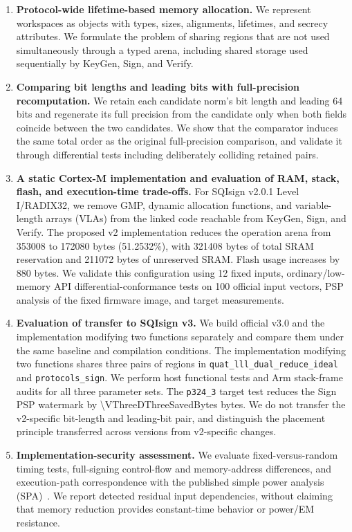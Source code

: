 \documentclass[a4paper,10pt]{article}
\theoremstyle{definition}
\theoremstyle{remark}
\begin{document}
\begin{enumerate}[leftmargin=2.2em]
  \item \textbf{Protocol-wide lifetime-based memory allocation.}
        We represent workspaces as objects with types, sizes, alignments, lifetimes, and secrecy attributes. We formulate the problem of sharing regions that are not used simultaneously through a typed arena, including shared storage used sequentially by KeyGen, Sign, and Verify.
  \item \textbf{Comparing bit lengths and leading bits with full-precision recomputation.}
        We retain each candidate norm's bit length and leading 64 bits and regenerate its full precision from the candidate only when both fields coincide between the two candidates. We show that the comparator induces the same total order as the original full-precision comparison, and validate it through differential tests including deliberately colliding retained pairs.
  \item \textbf{A static Cortex-M implementation and evaluation of RAM, stack, flash, and execution-time trade-offs.}
        For SQIsign v2.0.1 Level I/RADIX32, we remove GMP, dynamic allocation functions, and variable-length arrays (VLAs) from the linked code reachable from KeyGen, Sign, and Verify. The proposed v2 implementation reduces the operation arena from \num{353008} to \num{172080} bytes (\num{51.2532}\%), with \num{321408} bytes of total SRAM reservation and \num{211072} bytes of unreserved SRAM. Flash usage increases by \num{880} bytes. We validate this configuration using 12 fixed inputs, ordinary/low-memory API differential-conformance tests on 100 official input vectors, PSP analysis of the fixed firmware image, and target measurements.
  \item \textbf{Evaluation of transfer to SQIsign v3.}
        We build official v3.0 and the implementation modifying two functions separately and compare them under the same baseline and compilation conditions. The implementation modifying two functions shares three pairs of regions in \texttt{quat\_lll\_dual\_reduce\_ideal} and \texttt{protocols\_sign}. We perform host functional tests and Arm stack-frame audits for all three parameter sets. The \texttt{p324\_3} target test reduces the Sign PSP watermark by \num{\VThreeDThreeSavedBytes} bytes. We do not transfer the v2-specific bit-length and leading-bit pair, and distinguish the placement principle transferred across versions from v2-specific changes.
  \item \textbf{Implementation-security assessment.}
        We evaluate fixed-versus-random timing tests, full-signing control-flow and memory-address differences, and execution-path correspondence with the published simple power analysis (SPA)~\cite{spa-2025}. We report detected residual input dependencies, without claiming that memory reduction provides constant-time behavior or power/EM resistance.
\end{enumerate}
\end{document}
